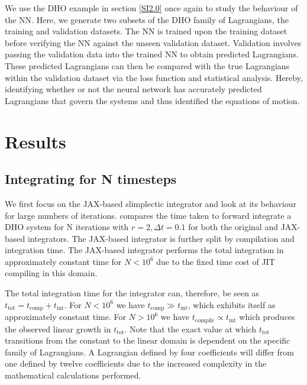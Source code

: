 \documentclass[10pt]{iopart}
\begin{document}
We use the DHO example in section \ref{SI2.0} once again to study the behaviour of the NN. Here, we generate two subsets of the DHO family of Lagrangians, the training and validation datasets. The NN is trained upon the training dataset before verifying the NN against the unseen  validation dataset. Validation involves passing the validation data into the trained NN to obtain predicted Lagrangians. These predicted Lagrangians can then be compared with the true Lagrangians within the validation dataset via the loss function and statistical analysis. Hereby, identifying whether or not the neural network has accurately predicted Lagrangians that govern the systems and thus identified the equations of motion.

\section{Results}
\subsection{Integrating for N timesteps}
We first focus on the JAX-based slimplectic integrator and look at its behaviour for large numbers of iterations.  compares the time taken to forward integrate a DHO system for N iterations with $r=2, \Delta t = 0.1$ for both the original and JAX-based integrators. The JAX-based integrator is further split by compilation and integration time. The JAX-based integrator performs the total integration in approximately constant time for $N<10^6$ due to the fixed time cost of JIT compiling in this domain.

The total integration time for the integrator can, therefore, be seen as $t_{\textrm{tot}} = t_{\textrm{comp}} + t_{\textrm{int}}$. For $N<10^6$ we have $t_{\textrm{comp}} \gg t_{\textrm{int}}$, which exhibits itself as approximately constant time. For $N > 10^6$ we have $t_{\textrm{compile}} \propto t_{\textrm{int}}$ which produces the observed linear growth in $t_{\textrm{tot}}$.
Note that the exact value at which $t_{\textrm{tot}}$ transitions from the constant to the linear domain is dependent on the specific family of Lagrangians. A Lagrangian defined by four coefficients will differ from one defined by twelve coefficients due to the increased complexity in the mathematical calculations performed.
\end{document}
